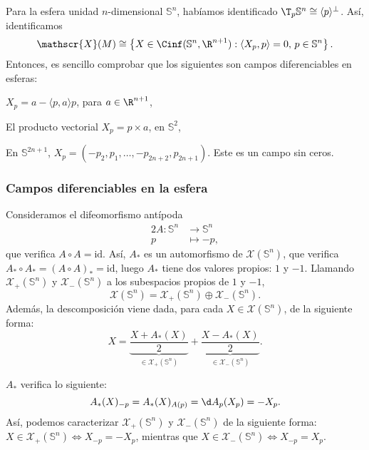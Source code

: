 \begin{ejemplo}
  Para la esfera unidad $n$-dimensional $\mathbb{S}^{n}$, habíamos identificado
  $\T_{p}\mathbb{S}^{n} \cong \langle p\rangle^{\perp}$. Así, identificamos
  \[
    \mathscr{X}(M) \cong \left\{ X\in\Cinf(\mathbb{S}^{n}, \R^{n+1}) : \langle
      X_{p}, p\rangle = 0,\, p\in\mathbb{S}^{n} \right\}
  .\]
Entonces, es sencillo comprobar que los siguientes son campos diferenciables en
esferas:
\begin{nlist}
\item
  $X_{p} = a - \langle p, a\rangle p$, para $a\in \R^{n+1}$,
\item
  El producto vectorial $X_{p} = p\times a$, en $\mathbb{S}^{2}$,
\item
  En $\mathbb{S}^{2n+1}$, $X_{p} = (-p_{2},p_{1}, \dots, -p_{2n+2},
  p_{2n+1})$. Este es un campo sin ceros.
\end{nlist}
\end{ejemplo}

\subsubsection{Campos diferenciables en la esfera}

Consideramos el difeomorfismo antípoda
\begin{alignat*}{2}
  A: \mathbb{S}^{n} & \to \mathbb{S}^{n} \\
 p & \mapsto -p,
\end{alignat*}
que verifica $A\circ A = \mathrm{id}$. Así, $A_{*}$ es un automorfismo de
$\mathscr{X}(\mathbb{S}^{n})$, que verifica $A_{*}\circ A_{*} = (A\circ A)_{*} =
\mathrm{id}$, luego $A_{*}$ tiene dos valores propios: $1$ y $-1$. Llamando
$\mathscr{X}_{+}(\mathbb{S}^{n})$ y $\mathscr{X}_{-}(\mathbb{S}^{n})$ a los subespacios propios de $1$ y $-1$,
\[
  \mathscr{X}(\mathbb{S}^{n}) = \mathscr{X}_{+}(\mathbb{S}^{n})\oplus \mathscr{X}_{-}(\mathbb{S}^{n})
  .\]
Además, la descomposición viene dada, para cada $X\in
\mathscr{X}(\mathbb{S}^{n})$, de la siguiente forma:
\[
  X = \underbrace{\frac{X+A_{*}(X)}{2}}_{\in \mathscr{X}_{+}(\mathbb{S}^{n})} +
  \underbrace{\frac{X-A_{*}(X)}{2}}_{\in \mathscr{X}_{-}(\mathbb{S}^{n})}
.\]

$A_{*}$ verifica lo siguiente:
\[
  A_{*}(X)_{-p} = A_{*}(X)_{A(p)} = \d A_{p}(X_{p}) = -X_{p}.
\]
Así, podemos caracterizar $\mathscr{X}_{+}(\mathbb{S}^{n})$ y $\mathscr{X}_{-}(\mathbb{S}^{n})$ de la siguiente
forma: $X\in \mathscr{X}_{+}(\mathbb{S}^{n}) \iff X_{-p} = -X_{p}$, mientras que $X\in
\mathscr{X}_{-}(\mathbb{S}^{n}) \iff X_{-p} = X_{p}$.

